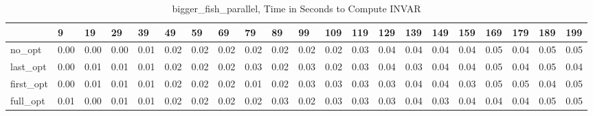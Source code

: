 \begin{table}
\caption{bigger_fish_parallel, Time in Seconds to Compute INVAR}
\label{bigger_fish_parallel_INVAR_time}
\begin{tabular}{lllllllllllllllllllll}
\toprule
 & 9 & 19 & 29 & 39 & 49 & 59 & 69 & 79 & 89 & 99 & 109 & 119 & 129 & 139 & 149 & 159 & 169 & 179 & 189 & 199 \\
\midrule
no_opt & 0.00 & 0.00 & 0.00 & 0.01 & 0.02 & 0.02 & 0.02 & 0.02 & 0.02 & 0.02 & 0.02 & 0.03 & 0.04 & 0.04 & 0.04 & 0.04 & 0.05 & 0.04 & 0.05 & 0.05 \\
last_opt & 0.00 & 0.01 & 0.01 & 0.01 & 0.02 & 0.02 & 0.02 & 0.03 & 0.02 & 0.03 & 0.02 & 0.03 & 0.04 & 0.03 & 0.04 & 0.04 & 0.05 & 0.04 & 0.05 & 0.04 \\
first_opt & 0.00 & 0.01 & 0.01 & 0.01 & 0.02 & 0.02 & 0.02 & 0.01 & 0.02 & 0.03 & 0.03 & 0.03 & 0.03 & 0.04 & 0.04 & 0.03 & 0.05 & 0.05 & 0.04 & 0.05 \\
full_opt & 0.01 & 0.00 & 0.01 & 0.01 & 0.02 & 0.02 & 0.02 & 0.02 & 0.03 & 0.02 & 0.03 & 0.03 & 0.03 & 0.04 & 0.03 & 0.04 & 0.04 & 0.04 & 0.05 & 0.05 \\
\bottomrule
\end{tabular}
\end{table}
